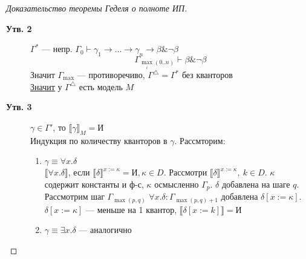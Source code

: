 \documentclass[oneside]{book}
\newcommand{\llb}{\llbracket}
\newcommand{\rrb}{\rrbracket}
\theoremstyle{plain}
\theoremstyle{remark}
\theoremstyle{definition}
\begin{document}
\begin{proof}[Доказательство теоремы Геделя о полноте ИП]
\begin{description}
\begin{description}
\end{description}
\item[{\textbf{Утв. 2}}] \(\Gamma^*\) --- непр. \(\Gamma_0 \vdash \gamma_1 \to \dots \to \gamma_n \to \beta \& \neg \beta\)
\[ \Gamma_{\max_i(0..n)} \vdash \beta \& \neg \beta \]
Значит \(\Gamma_\max\) --- противоречиво, \(\Gamma^\triangle = \Gamma^*\) без кванторов \\
\uline{Значит} у \(\Gamma^\triangle\) есть модель \(M\)
\item[{\textbf{Утв. 3}}] \(\gamma \in \Gamma'\), то \(\llb \gamma \rrb_M = \text{И}\) \\
Индукция по количеству кванторов в \(\gamma\). Рассмторим:
\begin{enumerate}
\item \(\gamma \equiv \forall x. \delta\) \\
\(\llb \forall x. \delta \rrb\), если \(\llb \delta \rrb^{x := \kappa} = \text{И}, \kappa \in D\). Рассмотри \(\llb \delta \rrb^{x := \kappa},\ k \in D\). \(\kappa\) содержит константы и ф-с, \(\kappa\) осмысленно \(\Gamma_p\). \(\delta\) добавлена на шаге \(q\). Рассмотрим шаг \(\Gamma_{\max(p, q)}\) \(\forall x. \delta: \Gamma_{\max(p, q) + 1}\) добавлена \(\delta[x:=\kappa]\). \(\delta[x:=\kappa]\) --- меньше на 1 квантор, \(\llb \delta[x:=k] \rrb = \text{И}\)
\item \(\gamma \equiv \exists x. \delta\) --- аналогично
\end{enumerate}
\end{description}
\end{proof}
\end{document}
